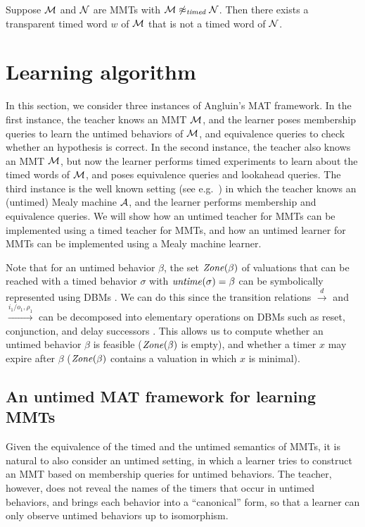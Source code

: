\begin{lemma}
\label{not timed}
Suppose ${\cal M}$ and ${\cal N}$ are MMTs with ${\cal M} \not\approx_{\mathit{timed}} {\cal N}$.
Then there exists a transparent timed word $w$ of ${\cal M}$ that is not a timed word of ${\cal N}$.
\end{lemma}

\fi

\section{Learning algorithm}  
\label{algorithm}
In this section, we consider three instances of Angluin's MAT framework.
In the first instance, the teacher knows an MMT ${\cal M}$, and the learner poses membership queries
to learn the untimed behaviors of ${\cal M}$, and equivalence queries to check whether an hypothesis is correct.
In the second instance, the teacher also knows an MMT ${\cal M}$, but now the 
learner performs timed experiments to learn about the
timed words of ${\cal M}$, and poses equivalence queries and lookahead queries.
The third instance is the well known setting (see e.g.\ \cite{Nie03,RSBM09}) 
in which the teacher knows an (untimed) Mealy machine ${\cal A}$,
and the learner performs membership and equivalence queries.
%
We will show how an untimed teacher for MMTs can be implemented using a timed teacher for MMTs,
and how an untimed learner for MMTs can be implemented using a Mealy machine learner.

\iflong
%
\else
Note that for an untimed behavior $\beta$, the set $\mathit{Zone}({\beta})$ of valuations that can be reached with a timed behavior $\sigma$ with $\mathit{untime}(\sigma) = \beta$ can be symbolically represented using DBMs \cite{Di89}.
We can do this since the transition relations $\xrightarrow{d}$ and $\xrightarrow{i_1/o_1, \rho_1}$ can be decomposed 
into elementary operations on DBMs such as reset, conjunction, and delay successors \cite{BengtssonY03}.
This allows us to compute whether an untimed behavior $\beta$ is feasible ($\mathit{Zone}({\beta})$ is empty), and
whether a timer $x$ may expire after $\beta$ ($\mathit{Zone}({\beta})$ contains a valuation in which $x$ is minimal).
\fi

\subsection{An untimed MAT framework for learning MMTs}
Given the equivalence of the timed and the untimed semantics of MMTs, it is natural to also 
consider an untimed setting, in which a learner tries to construct an MMT based on membership queries for untimed behaviors.
The teacher, however, does not reveal the names of the timers that occur in untimed behaviors, and brings each behavior into a
``canonical'' form, so that a learner can only observe untimed behaviors up to isomorphism.

